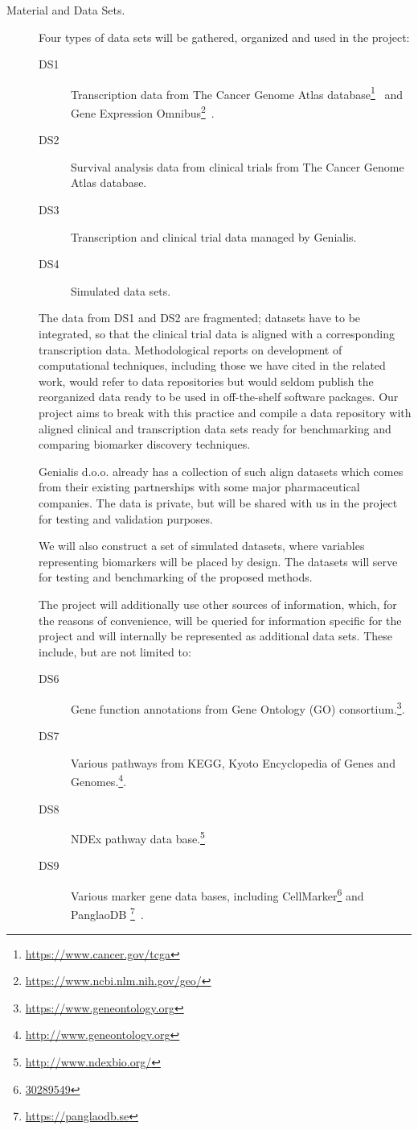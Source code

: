 \documentclass[11pt,a4paper]{article}
\newcommand{\myurl}[1]{\footnote{\url{#1}}}
\begin{document}
\begin{description}
	\item[Material and Data Sets.] Four types of data sets will be gathered, organized and used in the project:
	\begin{description}
		\item[DS1] Transcription data from The Cancer Genome Atlas database\myurl{https://www.cancer.gov/tcga}~\cite{24071849} and Gene Expression Omnibus\myurl{https://www.ncbi.nlm.nih.gov/geo/}~\cite{23193258}.
		\item[DS2] Survival analysis data from clinical trials from The Cancer Genome Atlas database.
		\item[DS3] Transcription and clinical trial data managed by Genialis.
		\item[DS4] Simulated data sets.
	\end{description}
	The data from DS1 and DS2 are fragmented; datasets have to be integrated, so that the clinical trial data is aligned with a corresponding transcription data. Methodological reports on development of computational techniques, including those we have cited in the related work, would refer to data repositories but would seldom publish the reorganized data ready to be used in off-the-shelf software packages. Our project aims to break with this practice and compile a data repository with aligned clinical and transcription data sets ready for benchmarking and comparing biomarker discovery techniques.
	
	Genialis d.o.o. already has a collection of such align datasets which comes from their existing partnerships with some major pharmaceutical companies. The data is private, but will be shared with us in the project for testing and validation purposes.

	We will also construct a set of simulated datasets, where variables representing biomarkers will be placed by design. The datasets will serve for testing and benchmarking of the proposed methods.

	The project will additionally use other sources of information, which, for the reasons of convenience, will be queried for information specific for the project and will internally be represented as additional data sets. These include, but are not limited to:

	\begin{description}
		\item[DS6] Gene function annotations from Gene Ontology (GO) consortium.\myurl{https://www.geneontology.org}.
		\item[DS7] Various pathways from KEGG, Kyoto Encyclopedia of Genes and Genomes.\myurl{http://www.geneontology.org}.
		\item[DS8] NDEx pathway data base.\myurl{http://www.ndexbio.org/}
		\item[DS9] Various marker gene data bases, including CellMarker\myurl{30289549} and PanglaoDB
		\myurl{https://panglaodb.se}~\cite{30951143}.
	\end{description}


\end{description}
\end{document}
